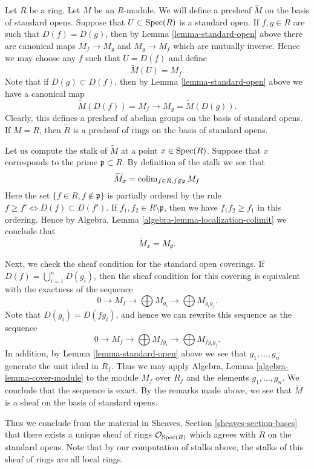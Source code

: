 \noindent
Let $R$ be a ring. Let $M$ be an $R$-module. We will define
a presheaf $\widetilde M$ on the basis of standard opens.
Suppose that $U \subset \mathop{\rm Spec}(R)$ is a standard open.
If $f, g \in R$ are such that $D(f) = D(g)$, then
by Lemma \ref{lemma-standard-open} above there are canonical
maps $M_f \to M_g$ and $M_g \to M_f$ which are mutually inverse.
Hence we may choose any $f$ such that $U = D(f)$
and define
$$
\widetilde M(U) = M_f.
$$
Note that if $D(g) \subset D(f)$, then by
Lemma \ref{lemma-standard-open} above we have
a canonical map
$$
\widetilde M(D(f)) = M_f \longrightarrow M_g = \widetilde M(D(g)).
$$
Clearly, this defines a presheaf of abelian groups on the basis
of standard opens. If $M = R$, then $\widetilde R$ is a presheaf
of rings on the basis of standard opens.

\medskip\noindent
Let us compute the stalk of $\widetilde M$ at a point $x \in \mathop{\rm Spec}(R)$.
Suppose that $x$ corresponds to the prime $\mathfrak p \subset R$.
By definition of the stalk we see that
$$
\widetilde M_x = \mathop{\rm colim}\nolimits_{f\in R, f\not\in \mathfrak p} M_f
$$
Here the set $\{f\in R, f\not\in \mathfrak p\}$ is partially
ordered by the rule $f \geq f' \Leftrightarrow D(f) \subset D(f')$.
If $f_1, f_2 \in R \setminus \mathfrak p$, then we have
$f_1f_2 \geq f_1$ in this ordering. Hence by
Algebra, Lemma \ref{algebra-lemma-localization-colimit}
we conclude that
$$
\widetilde M_x = M_{\mathfrak p}.
$$

\medskip\noindent
Next, we check the sheaf condition for the standard open coverings.
If $D(f) = \bigcup_{i = 1}^n D(g_i)$, then the sheaf condition
for this covering is equivalent with the exactness of the
sequence
$$
0 \to M_f \to \bigoplus M_{g_i} \to \bigoplus M_{g_ig_j}.
$$
Note that $D(g_i) = D(fg_i)$, and hence we can rewrite this
sequence as the sequence
$$
0 \to M_f \to \bigoplus M_{fg_i} \to \bigoplus M_{fg_ig_j}.
$$
In addition, by Lemma \ref{lemma-standard-open} above
we see that $g_1, \ldots, g_n$ generate the unit ideal
in $R_f$. Thus we may apply
Algebra, Lemma \ref{algebra-lemma-cover-module}
to the module $M_f$ over $R_f$ and the elements $g_1, \ldots, g_n$.
We conclude that the sequence is exact. By the remarks
made above, we see that $\widetilde M$ is a sheaf
on the basis of standard opens.

\medskip\noindent
Thus we conclude from the material in
Sheaves, Section \ref{sheaves-section-bases}
that there exists a
unique sheaf of rings $\mathcal{O}_{\mathop{\rm Spec}(R)}$
which agrees with $\widetilde R$ on the standard opens.
Note that by our computation of stalks above, the
stalks of this sheaf of rings are all local rings.

